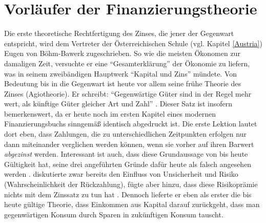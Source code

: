\section{Vorläufer der Finanzierungstheorie}
\label{FisherundKnight}

Die erste theoretische Rechtfertigung des Zinses, die jener der Gegenwart entspricht, wird dem Vertreter der Österreichischen Schule (vgl. Kapitel \ref{Austria}) Eugen von Böhm-Bawerk zugeschrieben. So wie die meisten Ökonomen zur damaligen Zeit, versuchte er eine "`Gesamterklärung"' der Ökonomie zu liefern, was in seinem zweibändigen Hauptwerk "`Kapital und Zins"' mündete. Von Bedeutung bis in die Gegenwart ist heute vor allem seine frühe Theorie des Zinses (Agiotheorie). Er schreibt: "`Gegenwärtige Güter sind in der Regel mehr wert, als künftige Güter gleicher Art und Zahl"' \parencite[S. 248]{BohmBawerk1888}. Dieser Satz ist insofern bemerkenswert, da er heute noch im ersten Kapitel eines modernen Finanzierungsbuchs sinngemäß identisch abgedruckt ist. Die erste Lektion lautet dort eben, dass Zahlungen, die zu unterschiedlichen Zeitpunkten erfolgen nur dann miteinander verglichen werden können, wenn sie vorher auf ihren Barwert \textit{abgezinst} werden. Interessant ist auch, dass diese Grundaussage von  \textcite{BohmBawerk1888} bis heute Gültigkeit hat, seine drei angeführten Gründe dafür heute als falsch angesehen werden \parencite[S. 316]{Rosner2012}. \textcite[S. 258ff]{BohmBawerk1888} diskutierte zwar bereits den Einfluss von Unsicherheit und Risiko (Wahrscheinlichkeit der Rückzahlung), fügte aber hinzu, dass diese Risikoprämie nichts mit dem Zinssatz zu tun hat \parencite[S. 261]{BohmBawerk1888}. Dennoch lieferte er eben als erster die bis heute gültige Theorie, dass Einkommen aus Kapital darauf zurückgeht, dass man gegenwärtigen Konsum durch Sparen in zukünftigen Konsum tauscht. 

